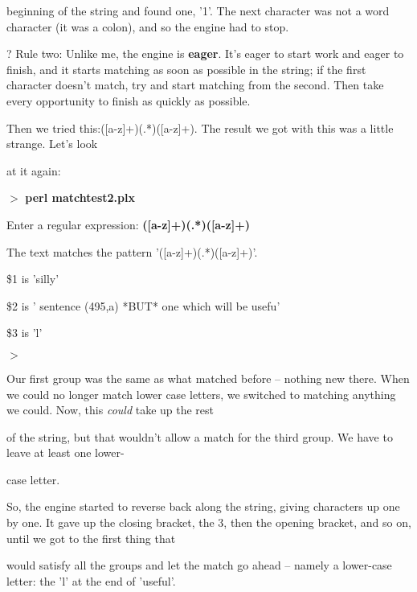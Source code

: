 \documentclass[a4paper,11pt]{book}
\begin{document}
\noindent beginning of the string and found one, '1'. The next character was not a word character (it was a colon), and so the engine had to stop.

\noindent 

\noindent ? Rule  two: Unlike me, the engine is \textbf{eager}. It's eager to start work and eager to finish, and it starts matching as soon as possible in the string; if the first character doesn't match, try and start matching from the second. Then take every opportunity to finish as quickly as possible.

\noindent 

\noindent Then we tried this:([a-z]+)(.*)([a-z]+). The result we got with this was a little strange. Let's look

\noindent at it again:

\noindent 

\noindent $>$ \textbf{perl matchtest2.plx}

\noindent Enter a regular expression: \textbf{([a-z]+)(.*)([a-z]+)}

\noindent The text matches the pattern '([a-z]+)(.*)([a-z]+)'.

\noindent \$1 is 'silly'

\noindent \$2 is ' sentence (495,a) *BUT* one which will be usefu'

\noindent \$3 is 'l'

\noindent $>$

\noindent 

\noindent Our first  group was the same as  what  matched  before  --  nothing  new  there.  When  we  could  no  longer match lower  case letters, we switched  to  matching  anything  we  could.  Now,  this  \textit{could  }take  up  the  rest

\noindent of the  string,  but that wouldn't  allow  a  match  for  the  third  group.  We  have  to  leave at least one lower-

\noindent case letter.

\noindent 

\noindent So,  the engine started to  reverse  back  along  the  string,  giving  characters  up  one by  one.  It  gave up the closing  bracket,  the 3,  then  the  opening  bracket,  and  so  on,  until  we  got to  the first  thing  that

\noindent would satisfy all  the groups and  let  the  match  go  ahead  --  namely  a  lower-case  letter:  the 'l'  at  the end of 'useful'.

\noindent 
\end{document}
